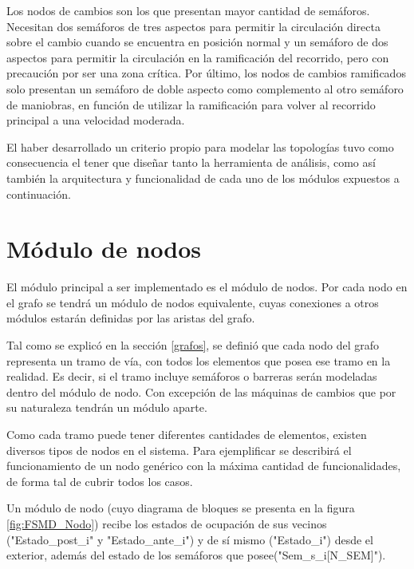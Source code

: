	Los nodos de cambios son los que presentan mayor cantidad de semáforos. Necesitan dos semáforos de tres aspectos para permitir la circulación directa sobre el cambio cuando se encuentra en posición normal y un semáforo de dos aspectos para permitir la circulación en la ramificación del recorrido, pero con precaución por ser una zona crítica. Por último, los nodos de cambios ramificados solo presentan un semáforo de doble aspecto como complemento al otro semáforo de maniobras, en función de utilizar la ramificación para volver al recorrido principal a una velocidad moderada.
	
	El haber desarrollado un criterio propio para modelar las topologías tuvo como consecuencia el tener que diseñar tanto la herramienta de análisis, como así también la arquitectura y funcionalidad de cada uno de los módulos expuestos a continuación.	
	
\section{Módulo de nodos}
\label{nodos}
	El módulo principal a ser implementado es el módulo de nodos. Por cada nodo en el grafo se tendrá un módulo de nodos equivalente, cuyas conexiones a otros módulos estarán definidas por las aristas del grafo.
	
	Tal como se explicó en la sección \ref{grafos}, se definió que cada nodo del grafo representa un tramo de vía, con todos los elementos que posea ese tramo en la realidad. Es decir, si el tramo incluye semáforos o barreras serán modeladas dentro del módulo de nodo. Con excepción de las máquinas de cambios que por su naturaleza tendrán un módulo aparte.	
	
	Como cada tramo puede tener diferentes cantidades de elementos, existen diversos tipos de nodos en el sistema. Para ejemplificar se describirá el funcionamiento de un nodo genérico con la máxima cantidad de funcionalidades, de forma tal de cubrir todos los casos.
	
	Un módulo de nodo (cuyo diagrama de bloques se presenta en la figura \ref{fig:FSMD_Nodo}) recibe los estados de ocupación de sus vecinos ("Estado\_post\_i" y "Estado\_ante\_i") y de sí mismo ("Estado\_i") desde el exterior, además del estado de los semáforos que posee("Sem\_s\_i[N\_SEM]"). 
	
